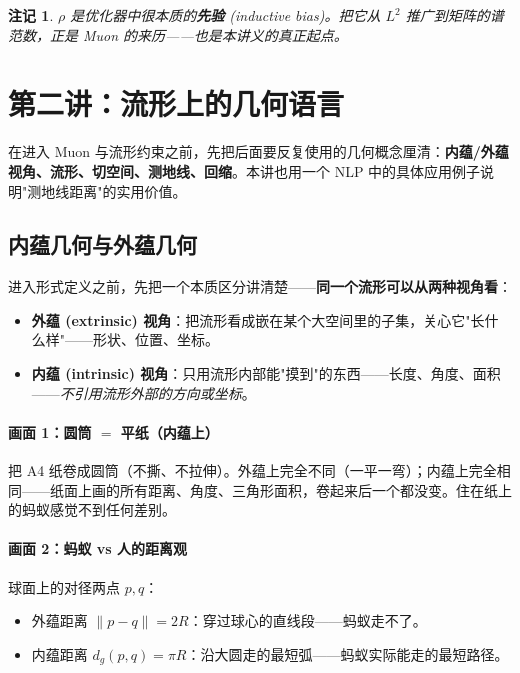 \documentclass[11pt,a4paper]{article}
\theoremstyle{mythm}
\theoremstyle{mydef}
\newtheorem{remark}[theorem]{注记}
\begin{document}
\begin{remark}
$\rho$ 是优化器中很本质的\textbf{先验} (inductive bias)。把它从 $L^2$ 推广到\emph{矩阵的谱范数}，正是 Muon 的来历——也是本讲义的真正起点。
\end{remark}

\section{第二讲：流形上的几何语言}\label{sec:geom}

在进入 Muon 与流形约束之前，先把后面要反复使用的几何概念厘清：\textbf{内蕴/外蕴视角、流形、切空间、测地线、回缩}。本讲也用一个 NLP 中的具体应用例子说明"测地线距离"的实用价值。

\subsection{内蕴几何与外蕴几何}\label{sec:intrinsic}

进入形式定义之前，先把一个本质区分讲清楚——\textbf{同一个流形可以从两种视角看}：

\begin{itemize}[leftmargin=2em]
\item \textbf{外蕴 (extrinsic) 视角}：把流形看成嵌在某个大空间里的子集，关心它"长什么样"——形状、位置、坐标。
\item \textbf{内蕴 (intrinsic) 视角}：只用流形内部能"摸到"的东西——长度、角度、面积——\emph{不引用流形外部的方向或坐标}。
\end{itemize}

\paragraph{画面 1：圆筒 $=$ 平纸（内蕴上）}
把 A4 纸卷成圆筒（不撕、不拉伸）。外蕴上完全不同（一平一弯）；内蕴上完全相同——纸面上画的所有距离、角度、三角形面积，卷起来后一个都没变。住在纸上的蚂蚁感觉不到任何差别。

\paragraph{画面 2：蚂蚁 vs 人的距离观}
球面上的对径两点 $p, q$：
\begin{itemize}[leftmargin=2em]
\item 外蕴距离 $\|p-q\| = 2R$：穿过球心的直线段——蚂蚁走不了。
\item 内蕴距离 $d_g(p,q) = \pi R$：沿大圆走的最短弧——蚂蚁实际能走的最短路径。
\end{itemize}
\end{document}
